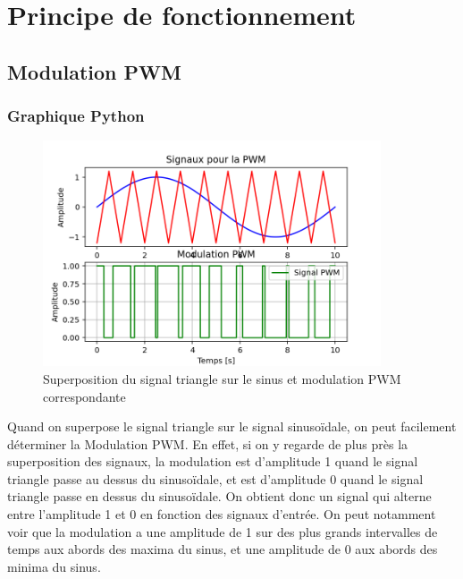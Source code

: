 \documentclass[a4paper,12pt,oneside]{report}	%
\begin{document}
\umonsCoverPage 

\tableofcontents
\newpage

\chapter{Principe de fonctionnement}
    \section{Modulation PWM}
        \subsection{Graphique Python}
            \begin{figure}[h!]
                \centering
                \includegraphics[width=10cm]{code-projet-python/1.1.1 - PWM btw sin and tri.png}
                \caption{Superposition du signal triangle sur le sinus et modulation PWM correspondante}
                \label{fig:pwm_modulation}
            \end{figure}
            
            Quand on superpose le signal triangle sur le signal sinusoïdale, on peut facilement déterminer la Modulation PWM. En effet, si on y regarde de plus près la superposition des signaux, la modulation est d'amplitude 1 quand le signal triangle passe au dessus du sinusoïdale, et est d'amplitude 0 quand le signal triangle passe en dessus du sinusoïdale. On obtient donc un signal qui alterne entre l'amplitude 1 et 0 en fonction des signaux d'entrée. On peut notamment voir que la modulation a une amplitude de 1 sur des plus grands intervalles de temps aux abords des maxima du sinus, et une amplitude de 0 aux abords des minima du sinus.
\end{document}
